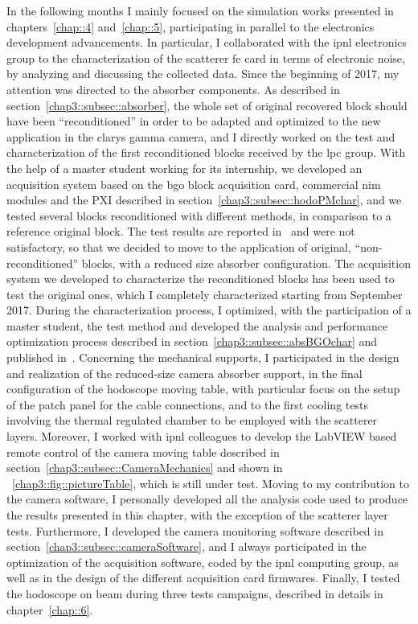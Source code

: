 In the following months I mainly focused on the simulation works presented in chapters~\ref{chap::4} and~\ref{chap::5}, participating in parallel to the electronics development advancements. In particular, I collaborated with the \gls{ipnl} electronics group to the characterization of the scatterer \gls{fe} card in terms of electronic noise, by analyzing and discussing the collected data. 
Since the beginning of 2017, my attention was directed to the absorber components. As described in section~\ref{chap3::subsec::absorber}, the whole set of original recovered block should have been \enquote{reconditioned} in order to be adapted and optimized to the new application in the \gls{clarys} gamma camera, and I directly worked on the test and characterization of the first reconditioned blocks received by the \gls{lpc} group. With the help of a master student working for its internship, we developed an acquisition system based on the \gls{bgo} block acquisition card, commercial \gls{nim} modules and the PXI described in section~\ref{chap3::subsec::hodoPMchar}, and we tested several blocks reconditioned with different methods, in comparison to a reference original block. The test results are reported in~\cite{Sandjong2017} and were not satisfactory, so that we decided to move to the application of original, \enquote{non-reconditioned} blocks, with a reduced size absorber configuration. The acquisition system we developed to characterize the reconditioned blocks has been used to test the original ones, which I completely characterized starting from September 2017. During the characterization process, I optimized, with the participation of a master student, the test method and developed the analysis and performance optimization process described in section~\ref{chap3::subsec::absBGOchar} and published in~\cite{Fontana2018}. 
Concerning the mechanical supports, I participated in the design and realization of the reduced-size camera absorber support, in the final configuration of the hodoscope moving table, with particular focus on the setup of the patch panel for the cable connections, and to the first cooling tests involving the thermal regulated chamber to be employed with the scatterer layers. Moreover, I worked with \gls{ipnl} colleagues to develop the LabVIEW based remote control of the camera moving table described in section~\ref{chap3::subsec::CameraMechanics} and shown in \figurename~\ref{chap3::fig::pictureTable}, which is still under test. 
Moving to my contribution to the camera software, I personally developed all the analysis code used to produce the results presented in this chapter, with the exception of the scatterer layer tests. Furthermore, I developed the camera monitoring software described in section~\ref{chap3::subsec::cameraSoftware}, and I always participated in the optimization of the acquisition software, coded by the \gls{ipnl} computing group, as well as in the design of the different acquisition card firmwares.          
Finally, I tested the hodoscope on beam during three tests campaigns, described in details in chapter~\ref{chap::6}.

